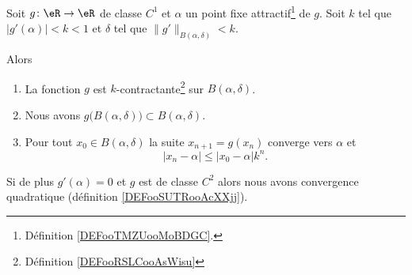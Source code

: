 \begin{proposition}      \label{PROPooRPHKooLnPCVJ}
    Soit \( g\colon \eR\to \eR\) de classe \( C^1\) et \( \alpha\) un point fixe attractif\footnote{Définition \ref{DEFooTMZUooMoBDGC}.} de \( g\). Soit \( k\) tel que \( | g'(\alpha) |<k<1\) et \( \delta\) tel que \( \| g' \|_{B(\alpha,\delta)}<k\).
    
    Alors
    \begin{enumerate}
        \item       \label{ITEMooOQKMooTRSvUo}
            La fonction \( g\) est \( k\)-contractante\footnote{Définition \ref{DEFooRSLCooAsWisu}} sur \( B(\alpha,\delta)\).
        \item       \label{ITEMooFTAQooPBsBcR}
            Nous avons \( g\big( B(\alpha,\delta) \big)\subset B(\alpha,\delta)\).
        \item       \label{ITEMooFSOAooKlcxih}
            Pour tout \( x_0\in B(\alpha,\delta)\) la suite \( x_{n+1}=g(x_n)\) converge vers \( \alpha\) et
            \begin{equation}
                | x_n-\alpha |\leq | x_0-\alpha |k^n.
            \end{equation}
    \end{enumerate}
    Si de plus \( g'(\alpha)=0\) et \( g\) est de classe \( C^2\) alors nous avons convergence quadratique (définition \ref{DEFooSUTRooAcXXjj}).
\end{proposition}

